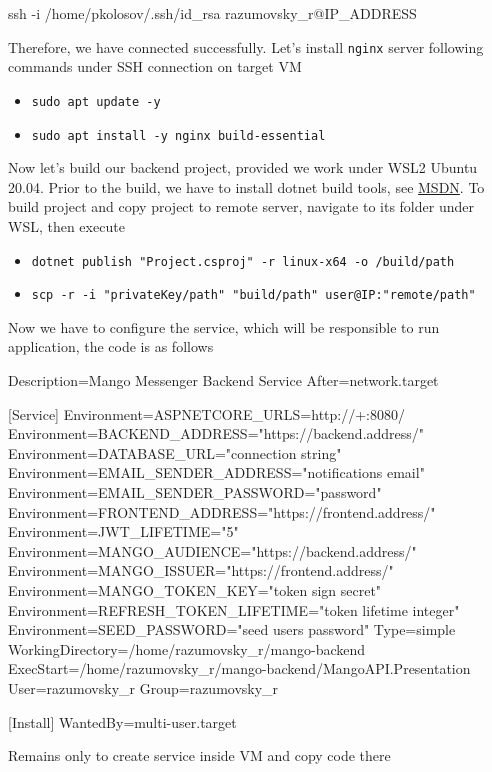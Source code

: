 \begin{spverbatim}
    ssh -i /home/pkolosov/.ssh/id_rsa razumovsky_r@IP_ADDRESS
\end{spverbatim}

Therefore, we have connected successfully.
Let's install \texttt{nginx} server following commands under SSH connection on target VM
\begin{itemize}
    \item \texttt{sudo apt update -y}
    \item \texttt{sudo apt install -y nginx build-essential}
\end{itemize}
Now let's build our backend project, provided we work under WSL2 Ubuntu 20.04.
Prior to the build, we have to install dotnet build tools, see
\href{https://docs.microsoft.com/en-us/dotnet/core/install/linux-ubuntu}{MSDN}.
To build project and copy project to remote server,
navigate to its folder under WSL, then execute

\begin{itemize}
    \item \texttt{dotnet publish "Project.csproj" -r linux-x64 -o /build/path}
    \item \texttt{scp -r -i "privateKey/path" "build/path" user@IP:"remote/path"}
\end{itemize}

Now we have to configure the service, which will be responsible to run application,
the code is as follows

\begin{center}
    \begin{spverbatim}
    [Unit]
        Description=Mango Messenger Backend Service
        After=network.target

        [Service]
        Environment=ASPNETCORE_URLS=http://+:8080/
        Environment=BACKEND_ADDRESS="https://backend.address/"
        Environment=DATABASE_URL="connection string"
        Environment=EMAIL_SENDER_ADDRESS="notifications email"
        Environment=EMAIL_SENDER_PASSWORD="password"
        Environment=FRONTEND_ADDRESS="https://frontend.address/"
        Environment=JWT_LIFETIME="5"
        Environment=MANGO_AUDIENCE="https://backend.address/"
        Environment=MANGO_ISSUER="https://frontend.address/"
        Environment=MANGO_TOKEN_KEY="token sign secret"
        Environment=REFRESH_TOKEN_LIFETIME="token lifetime integer"
        Environment=SEED_PASSWORD="seed users password"
        Type=simple
        WorkingDirectory=/home/razumovsky_r/mango-backend
        ExecStart=/home/razumovsky_r/mango-backend/MangoAPI.Presentation
        User=razumovsky_r
        Group=razumovsky_r

        [Install]
        WantedBy=multi-user.target
    \end{spverbatim}
\end{center}
Remains only to create service inside VM and copy code there

